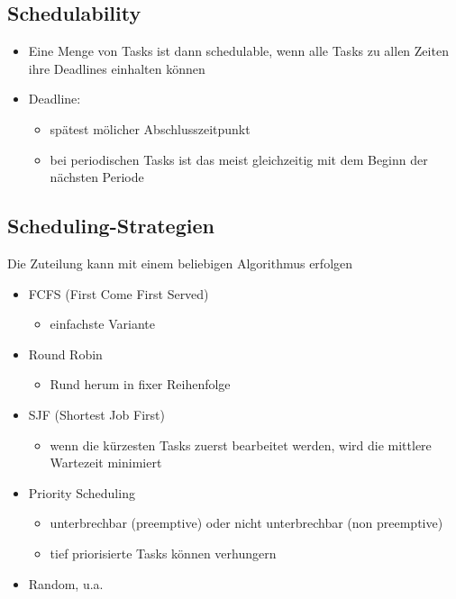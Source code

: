 \subsection{Schedulability}
\begin{itemize}
  \item Eine Menge von Tasks ist dann schedulable, wenn alle Tasks zu allen Zeiten ihre Deadlines einhalten können
  \item Deadline:
  \begin{itemize}
    \item spätest mölicher Abschlusszeitpunkt
    \item bei periodischen Tasks ist das meist gleichzeitig mit dem Beginn der nächsten Periode
  \end{itemize}
\end{itemize}

\subsection{Scheduling-Strategien}
Die Zuteilung kann mit einem beliebigen Algorithmus erfolgen
\begin{itemize}
  \item FCFS (First Come First Served)
  \begin{itemize}
    \item einfachste Variante
  \end{itemize}
  \item Round Robin
  \begin{itemize}
    \item Rund herum in fixer Reihenfolge
  \end{itemize}
  \item SJF (Shortest Job First)
  \begin{itemize}
    \item wenn die kürzesten Tasks zuerst bearbeitet werden, wird die mittlere Wartezeit minimiert
  \end{itemize}
  \item Priority Scheduling
  \begin{itemize}
    \item unterbrechbar (preemptive) oder nicht unterbrechbar (non preemptive)
    \item tief priorisierte Tasks können verhungern
  \end{itemize}
  \item Random, u.a.
\end{itemize}

